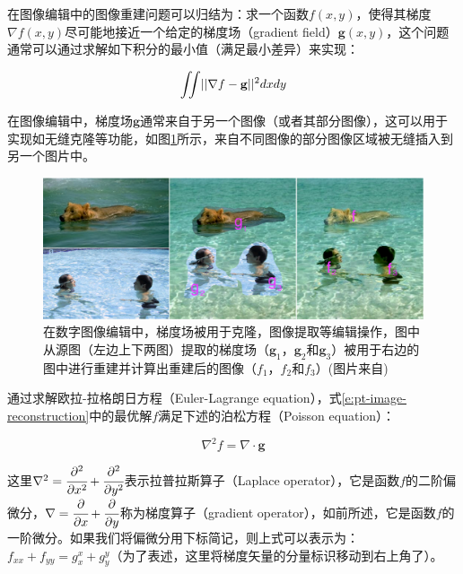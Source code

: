 在图像编辑中的图像重建问题可以归结为：求一个函数$f(x,y)$，使得其梯度$\nabla f(x,y)$尽可能地接近一个给定的梯度场（gradient field）$\mathbf{g}(x,y)$，这个问题通常可以通过求解如下积分的最小值（满足最小差异）来实现：

\begin{equation}\label{e:pt-image-reconstruction}
	{\rm \iint} ||\nabla f-\mathbf{g}||^{2}dxdy
\end{equation}

\noindent 在图像编辑中，梯度场$\mathbf{g}$通常来自于另一个图像（或者其部分图像），这可以用于实现如无缝克隆等功能，如图\ref{f:pt-image-reconstruction}所示，来自不同图像的部分图像区域被无缝插入到另一个图片中。

\begin{figure}
\begin{fullwidth}
	\includegraphics[width=1.0\thewidth]{figures/pt/image-reconstruction}
	\caption{在数字图像编辑中，梯度场被用于克隆，图像提取等编辑操作，图中从源图（左边上下两图）提取的梯度场（$\mathbf{g}_1$，$\mathbf{g}_2$和$\mathbf{g}_3$）被用于右边的图中进行重建并计算出重建后的图像（$f_1$，$f_2$和$f_3$）(图片来自\cite{a:PoissonImageEditing})}
	\label{f:pt-image-reconstruction}
\end{fullwidth}
\end{figure}

通过求解欧拉-拉格朗日方程（Euler-Lagrange equation），式\ref{e:pt-image-reconstruction}中的最优解$f$满足下述的泊松方程（Poisson equation）：

\begin{equation}
	\nabla^{2}f=\nabla\cdot\mathbf{g}
\end{equation}

\noindent 这里$\nabla^{2}= \cfrac{{\rm \partial}^{2}}{{\rm \partial} x^{2}}+ \cfrac{{\rm \partial}^{2}}{{\rm \partial} y^{2}}$表示拉普拉斯算子（Laplace operator），它是函数$f$的二阶偏微分，$\nabla= \cfrac{{\rm \partial}}{{\rm \partial} x}+ \cfrac{{\rm \partial}}{{\rm \partial} y}$称为梯度算子（gradient operator），如前所述，它是函数$f$的一阶微分。如果我们将偏微分用下标简记，则上式可以表示为：$f_{xx}+f_{yy}=g^{x}_x+g^{y}_y$（为了表述，这里将梯度矢量的分量标识移动到右上角了）。

